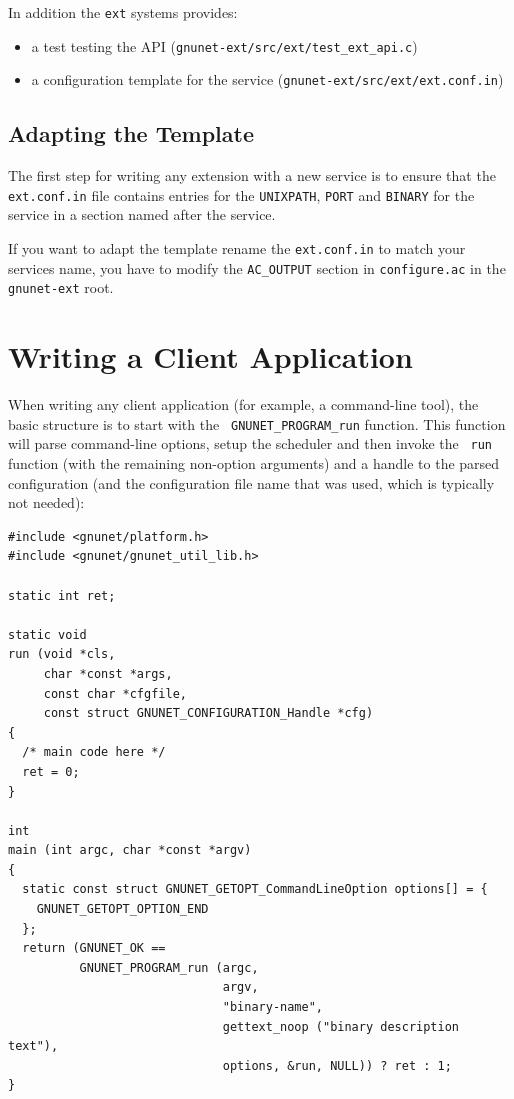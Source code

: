 \documentclass[10pt]{article}
\begin{document}
In addition the \texttt{ext} systems provides:
\begin{itemize}
\itemsep0em
  \item a test testing the API (\lstinline|gnunet-ext/src/ext/test_ext_api.c|)
  \item a configuration template for the service (\lstinline|gnunet-ext/src/ext/ext.conf.in|)
\end{itemize}


\subsection{Adapting the Template}

The first step for writing any extension with a new service is to
ensure that the {\tt ext.conf.in} file contains entries for the
\texttt{UNIXPATH}, \texttt{PORT} and \texttt{BINARY} for the service in a section named after
the service.

If you want to adapt the template rename the {\tt ext.conf.in} to match your
services name, you have to modify the \texttt{AC\_OUTPUT} section in {\tt configure.ac}
in the \texttt{gnunet-ext} root.

\section{Writing a Client Application}

When writing any client application (for example, a command-line
tool), the basic structure is to start with the {\tt
  GNUNET\_PROGRAM\_run} function.  This function will parse
command-line options, setup the scheduler and then invoke the {\tt
  run} function (with the remaining non-option arguments) and a handle
to the parsed configuration (and the configuration file name that was
used, which is typically not needed):

\lstset{language=c}
\begin{lstlisting}
#include <gnunet/platform.h>
#include <gnunet/gnunet_util_lib.h>

static int ret;

static void
run (void *cls,
     char *const *args,
     const char *cfgfile,
     const struct GNUNET_CONFIGURATION_Handle *cfg)
{
  /* main code here */
  ret = 0;
}

int
main (int argc, char *const *argv)
{
  static const struct GNUNET_GETOPT_CommandLineOption options[] = {
    GNUNET_GETOPT_OPTION_END
  };
  return (GNUNET_OK ==
          GNUNET_PROGRAM_run (argc,
                              argv,
                              "binary-name",
                              gettext_noop ("binary description text"),
                              options, &run, NULL)) ? ret : 1;
}
\end{lstlisting}
\end{document}
